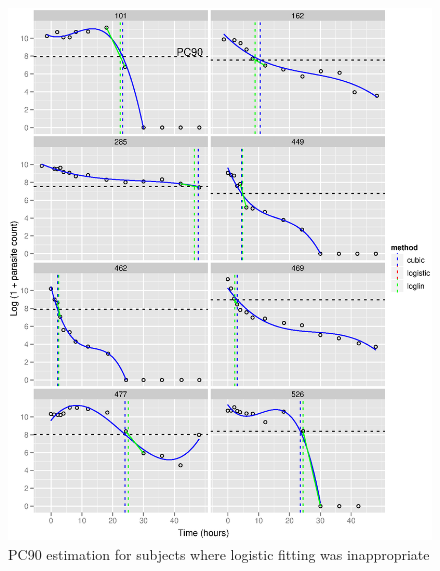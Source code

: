 \begin{figure}[h]
\includegraphics[width=6.5in]{pc90-nofit.eps} 
\caption{PC90 estimation for subjects where logistic fitting was inappropriate}
\label{pc90-bad}
\end{figure}
\clearpage
